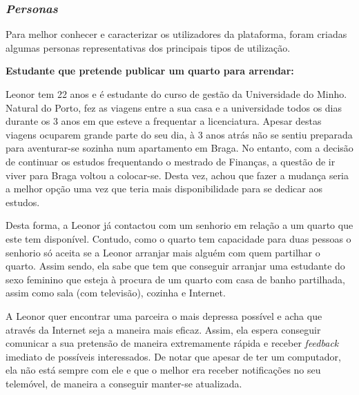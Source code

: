 \subsubsection{\textit{Personas}}
\label{sec:personas}

Para melhor conhecer e caracterizar os utilizadores da plataforma, foram criadas algumas personas representativas dos principais tipos de utilização.

\vspace{0.4cm}
\noindent\textbf{Estudante que pretende publicar um quarto para arrendar:}

Leonor tem 22 anos e é estudante do curso de gestão da Universidade do Minho.
Natural do Porto, fez as viagens entre a sua casa e a universidade todos os
dias durante os 3 anos em que esteve a frequentar a licenciatura. Apesar
destas viagens ocuparem grande parte do seu dia, à 3 anos atrás não se sentiu
preparada para aventurar-se sozinha num apartamento em Braga. No entanto, com
a decisão de continuar os estudos frequentando o mestrado de Finanças, a
questão de ir viver para Braga voltou a colocar-se. Desta vez, achou que fazer
a mudança seria a melhor opção uma vez que teria mais disponibilidade para se
dedicar aos estudos.

Desta forma, a Leonor já contactou com um senhorio em relação a um quarto que
este tem disponível. Contudo, como o quarto tem capacidade para duas pessoas o
senhorio só aceita se a Leonor arranjar mais alguém com quem partilhar o
quarto. Assim sendo, ela sabe que tem que conseguir arranjar uma estudante do
sexo feminino que esteja à procura de um quarto com casa de banho partilhada,
assim como sala (com televisão), cozinha e Internet.

A Leonor quer encontrar uma parceira o mais depressa possível e acha que
através da Internet seja a maneira mais eficaz. Assim, ela espera conseguir
comunicar a sua pretensão de maneira extremamente rápida e receber \textit{feedback}
imediato de possíveis interessados. De notar que apesar de ter um
computador, ela não está sempre com ele e que o melhor era receber notificações 
no seu telemóvel, de maneira a conseguir manter-se atualizada.


